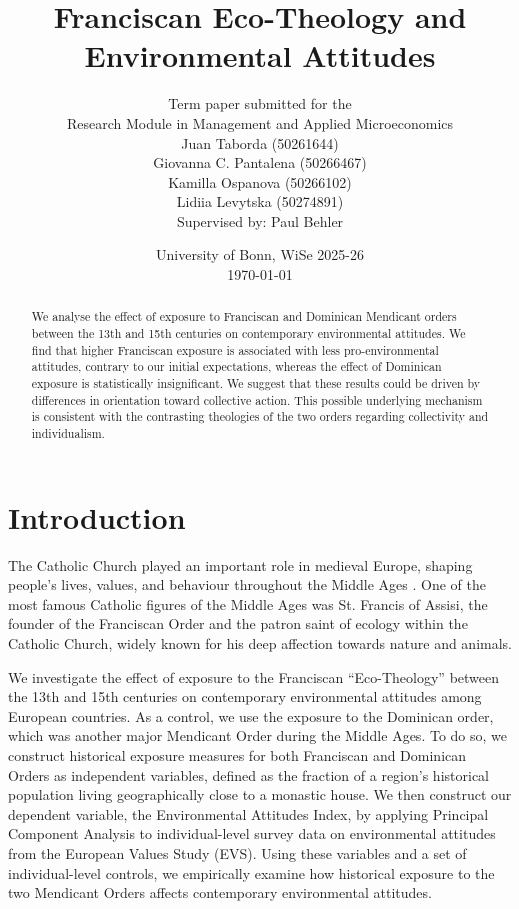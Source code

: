 \documentclass[12pt, a4paper]{article}
\title{Franciscan Eco-Theology and \\ Environmental Attitudes}
\author{
Term paper submitted for the \\
Research Module in Management and Applied Microeconomics\\[2.0em]
Juan Taborda (50261644) \\
Giovanna C. Pantalena (50266467) \\
Kamilla Ospanova (50266102) \\
Lidiia Levytska (50274891) \\[1.0em]
Supervised by: Paul Behler \\}
\date{\vspace{0.7cm} University of Bonn, WiSe 2025-26 \\ \vspace{0.5cm} \today}
\begin{document}
\maketitle

\vspace{1.5cm}

\begin{abstract}
We analyse the effect of exposure to Franciscan and Dominican Mendicant orders between the 13th and 15th centuries 
on contemporary environmental attitudes. We find that higher Franciscan exposure is associated with less 
pro-environmental attitudes, contrary to our initial expectations, whereas the effect of Dominican exposure is 
statistically insignificant. We suggest that these results could be driven by differences in orientation toward 
collective action. This possible underlying mechanism is consistent with the contrasting theologies of the two orders 
regarding collectivity and individualism.
\end{abstract}



\newpage

\section{Introduction}
The Catholic Church played an important role in medieval Europe, shaping people’s lives, values, and behaviour 
throughout the Middle Ages \parencite{lynch2014}. One of the most famous Catholic figures of the Middle Ages was
St. Francis of Assisi, the founder of the Franciscan Order and the patron saint of ecology within the Catholic Church, 
widely known for his deep affection towards nature and animals.

We investigate the effect of exposure to the Franciscan 
``Eco-Theology'' between the 13th and 15th centuries on contemporary environmental attitudes among European countries. 
As a control, we use the exposure to the Dominican order, which was another major Mendicant Order during the 
Middle Ages. To do so, we construct historical exposure measures for both
Franciscan and Dominican Orders as independent variables, defined as the fraction of a region’s historical population 
living geographically close to a monastic house. We then construct our dependent variable, the Environmental Attitudes Index, 
by applying Principal Component Analysis to individual-level survey data on environmental
attitudes from the European Values Study (EVS). Using these variables and a set of individual-level controls, 
we empirically examine how historical exposure to the two Mendicant Orders affects contemporary environmental attitudes.
\end{document}

